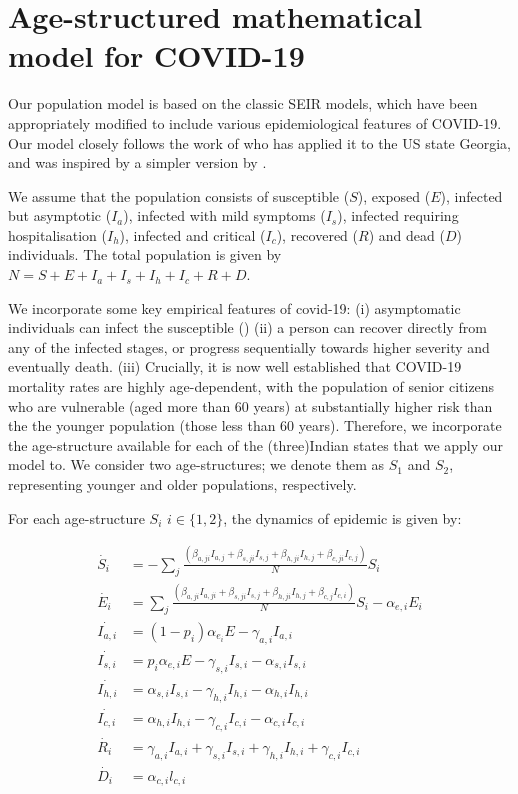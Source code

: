 \documentclass{article}
\begin{document}
\section{Age-structured mathematical model for COVID-19}
Our population model is based on the classic SEIR models, which have been appropriately modified to include 
various epidemiological features of COVID-19. 
Our model closely follows the work of \cite{weitz2020} who has applied it to the US state Georgia, and was inspired by a simpler version by \cite{hill2020}. 

We assume that the population consists of susceptible ($S$), exposed ($E$), infected but asymptotic ($I_a$),  infected with mild symptoms ($I_s$),  infected requiring hospitalisation ($I_h$), infected and critical ($I_c$), recovered ($R$) and dead ($D$) individuals. The total population is given by $N=S+E+I_a+I_s+I_h+I_c+R+D$.

We incorporate some key empirical features of covid-19: (i) asymptomatic individuals can infect the susceptible (\cite{li2020science,park2020}) 
(ii) a person can recover directly from any of the infected stages, or progress sequentially towards higher severity and eventually death. 
(iii) Crucially, it is now well established that COVID-19 mortality rates are highly age-dependent, with the population of senior citizens who are 
vulnerable (aged more than 60 years) at substantially higher risk than the the younger population (those less than 60 years). Therefore, we incorporate the age-structure available for each of the (three)Indian states that we apply our model to. We consider two age-structures; we denote them as $S_1$ and $S_2$, representing younger and older populations, respectively. 

For each age-structure $S_i \,\, i \in \{1,2\}$, the dynamics of epidemic is given by:

\begin{align}
\dot{S_i} & = - \sum_j \frac{(\beta_{a,ji} I_{a,j} + \beta_{s,ji} I_{s,j} +  \beta_{h,ji} I_{h,j} + \beta_{c,ji} I_{c,j})}{N} S_i \\
\dot{E_i} & = \sum_j \frac{(\beta_{a,ji} I_{a,ji} + \beta_{s,ji} I_{s,j} +  \beta_{h,ji} I_{h,j} + \beta_{c,j} I_{c,i})}{N} S_i - \alpha_{e,i} E_i \\
\dot{I_{a,i}} & = (1-p_i) \alpha_{e_i} E - \gamma_{a,i} I_{a,i} \\
\dot{I_{s,i}} & =  p_i \alpha_{e,i} E   - \gamma_{s,i} I_{s,i} -  \alpha_{s,i} I_{s,i} \\
\dot{I_{h,i}} & =  \alpha_{s,i}  I_{s,i} -  \gamma_{h,i} I_{h,i}  -\alpha_{h,i} I_{h,i}  \\
\dot{I_{c,i}} & =  \alpha_{h,i} I_{h,i} - \gamma_{c,i} I_{c,i}  - \alpha_{c,i} I_{c,i}\\
\dot{R_i} & = \gamma_{a,i} I_{a,i} +  \gamma_{s,i} I_{s,i} + \gamma_{h,i} I_{h,i} + \gamma_{c,i} I_{c,i} \\
\dot{D_i} & =  \alpha_{c,i} l_{c,i} 
\end{align}
\end{document}
